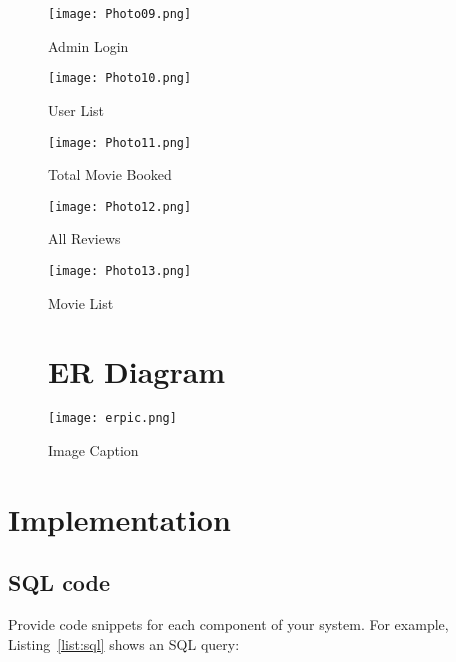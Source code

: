 \documentclass[a4paper,12pt]{article}  %
\begin{document}
\begin{figure}[h!]
    \centering
    \texttt{[image: Photo09.png]}
    \caption{Admin Login}
    \label{fig:photo12}
\end{figure}

\newpage



\begin{figure}[h!]
    \centering
    \texttt{[image: Photo10.png]}
    \caption{User List}
    \label{fig:photo13}
\end{figure}

\begin{figure}[h!]
    \centering
    \texttt{[image: Photo11.png]}
    \caption{Total Movie Booked}
    \label{fig:photo14}
\end{figure}
\newpage
\begin{figure}[h!]
    \centering
    \texttt{[image: Photo12.png]}
    \caption{All Reviews}
    \label{fig:photo06}
\end{figure}





\begin{figure}[h!]
    \centering
    \texttt{[image: Photo13.png]}
    \caption{Movie List}
    \label{fig:photo}
\end{figure}
\newpage






\newpage
\newpage


\begin{figure}[h!]
\section{ER Diagram}
    \centering
    \texttt{[image: erpic.png]}
    \caption{Image Caption}
    \label{fig:photo06}
\end{figure}

\newpage



\clearpage




\section{Implementation} \label{sec:imp}

\subsection{SQL code}
Provide code snippets for each component of your system. For example, Listing~\ref{list:sql} shows an SQL query:
\end{document}
